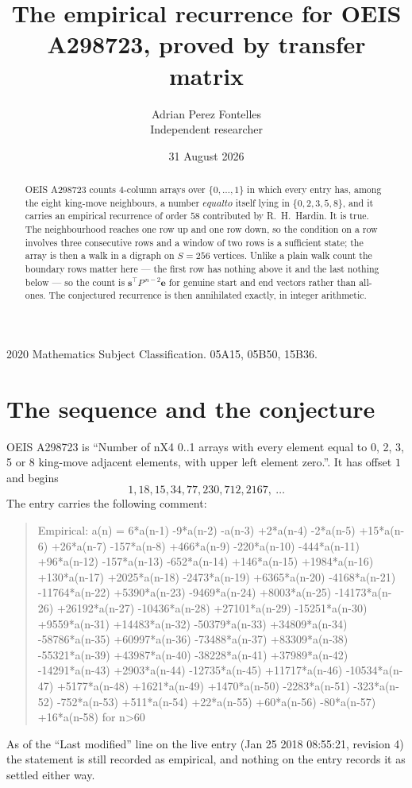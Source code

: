 \documentclass[11pt,a4paper]{article}
\title{The empirical recurrence for OEIS A298723, proved by transfer matrix}
\author{Adrian Perez Fontelles\\ \small Independent researcher}
\date{31 August 2026}
\theoremstyle{plain}
\theoremstyle{definition}
\begin{document}
\maketitle

\begin{abstract}
OEIS A298723 counts $4$-column arrays over $\{0,\dots,1\}$ in which every entry has,
among the eight king-move neighbours, a number $equal to$ itself lying in $\{0,2,3,5,8\}$, and it carries an empirical
recurrence of order $58$ contributed by R.~H.~Hardin. It is true. The neighbourhood
reaches one row up and one row down, so the condition on a row involves three consecutive
rows and a window of two rows is a sufficient state; the array is then a walk in a digraph
on $S=256$ vertices. Unlike a plain walk count the boundary rows matter here --- the first
row has nothing above it and the last nothing below --- so the count is
$\mathbf{s}^{\!\top}P^{\,n-2}\mathbf{e}$ for genuine start and end vectors rather than
all-ones. The conjectured recurrence is then annihilated exactly, in integer arithmetic.
\end{abstract}

\noindent\small 2020 Mathematics Subject Classification. 05A15, 05B50, 15B36.\normalsize

\section{The sequence and the conjecture}

OEIS A298723 is ``Number of nX4 0..1 arrays with every element equal to 0, 2, 3, 5 or 8 king-move adjacent elements, with upper left element zero.''. It has offset
$1$ and begins
\[
1, 18, 15, 34, 77, 230, 712, 2167,\ \dots
\]
The entry carries the following comment:
\begin{quote}\small
Empirical: a(n) = 6*a(n-1) -9*a(n-2) -a(n-3) +2*a(n-4) -2*a(n-5) +15*a(n-6) +26*a(n-7) -157*a(n-8) +466*a(n-9) -220*a(n-10) -444*a(n-11) +96*a(n-12) -157*a(n-13) -652*a(n-14) +146*a(n-15) +1984*a(n-16) +130*a(n-17) +2025*a(n-18) -2473*a(n-19) +6365*a(n-20) -4168*a(n-21) -11764*a(n-22) +5390*a(n-23) -9469*a(n-24) +8003*a(n-25) -14173*a(n-26) +26192*a(n-27) -10436*a(n-28) +27101*a(n-29) -15251*a(n-30) +9559*a(n-31) +14483*a(n-32) -50379*a(n-33) +34809*a(n-34) -58786*a(n-35) +60997*a(n-36) -73488*a(n-37) +83309*a(n-38) -55321*a(n-39) +43987*a(n-40) -38228*a(n-41) +37989*a(n-42) -14291*a(n-43) +2903*a(n-44) -12735*a(n-45) +11717*a(n-46) -10534*a(n-47) +5177*a(n-48) +1621*a(n-49) +1470*a(n-50) -2283*a(n-51) -323*a(n-52) -752*a(n-53) +511*a(n-54) +22*a(n-55) +60*a(n-56) -80*a(n-57) +16*a(n-58) for n>60
\end{quote}
As of the ``Last modified'' line on the live entry (Jan 25 2018 08:55:21, revision
4) the statement is still recorded as empirical, and nothing on the entry
records it as settled either way.
\end{document}
